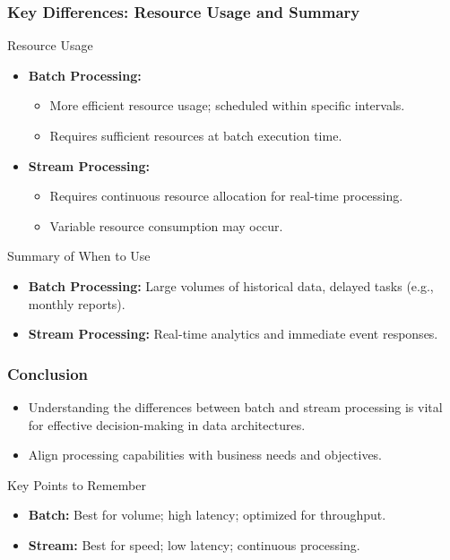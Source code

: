 \documentclass[aspectratio=169]{beamer}
\begin{document}
\begin{frame}[fragile]
    \frametitle{Key Differences: Resource Usage and Summary}
    \begin{block}{Resource Usage}
        \begin{itemize}
            \item \textbf{Batch Processing:}
                \begin{itemize}
                    \item More efficient resource usage; scheduled within specific intervals.
                    \item Requires sufficient resources at batch execution time.
                \end{itemize}
            \item \textbf{Stream Processing:}
                \begin{itemize}
                    \item Requires continuous resource allocation for real-time processing.
                    \item Variable resource consumption may occur.
                \end{itemize}
        \end{itemize}
    \end{block}

    \begin{block}{Summary of When to Use}
        \begin{itemize}
            \item \textbf{Batch Processing:} Large volumes of historical data, delayed tasks (e.g., monthly reports).
            \item \textbf{Stream Processing:} Real-time analytics and immediate event responses.
        \end{itemize}
    \end{block}
\end{frame}

\begin{frame}[fragile]
    \frametitle{Conclusion}
    \begin{itemize}
        \item Understanding the differences between batch and stream processing is vital for effective decision-making in data architectures.
        \item Align processing capabilities with business needs and objectives.
    \end{itemize}
    
    \begin{block}{Key Points to Remember}
        \begin{itemize}
            \item \textbf{Batch:} Best for volume; high latency; optimized for throughput.
            \item \textbf{Stream:} Best for speed; low latency; continuous processing.
        \end{itemize}
    \end{block}
\end{frame}
\end{document}
